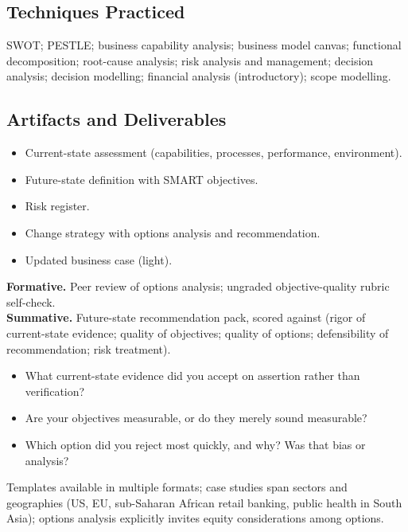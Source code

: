 \documentclass[11pt,letterpaper,oneside]{report}
\begin{document}
\subsection*{Techniques Practiced}
SWOT; PESTLE; business capability analysis; business model canvas; functional decomposition; root-cause analysis; risk analysis and management; decision analysis; decision modelling; financial analysis (introductory); scope modelling.

\subsection*{Artifacts and Deliverables}
\begin{itemize}
  \item Current-state assessment (capabilities, processes, performance, environment).
  \item Future-state definition with SMART objectives.
  \item Risk register.
  \item Change strategy with options analysis and recommendation.
  \item Updated business case (light).
\end{itemize}

\begin{curriculumassessment}
\textbf{Formative.} Peer review of options analysis; ungraded objective-quality rubric self-check.\\[3pt]
\textbf{Summative.} Future-state recommendation pack, scored against  (rigor of current-state evidence; quality of objectives; quality of options; defensibility of recommendation; risk treatment).
\end{curriculumassessment}

\begin{curriculumreflection}
\begin{itemize}
  \item What current-state evidence did you accept on assertion rather than verification?
  \item Are your objectives measurable, or do they merely sound measurable?
  \item Which option did you reject most quickly, and why? Was that bias or analysis?
\end{itemize}
\end{curriculumreflection}

\begin{curriculumnote}
Templates available in multiple formats; case studies span sectors and geographies (US, EU, sub-Saharan African retail banking, public health in South Asia); options analysis explicitly invites equity considerations among options.
\end{curriculumnote}
\end{document}
